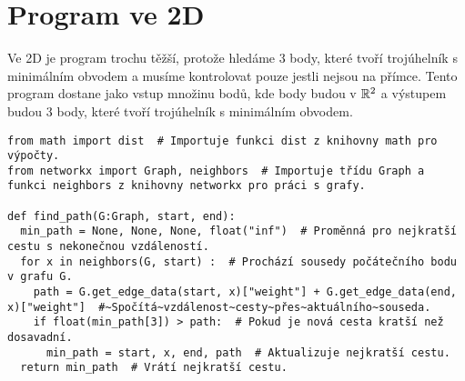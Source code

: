 \section{Program ve 2D}
\label{sec:program_2D}

Ve 2D je program trochu těžší, protože hledáme 3 body, které tvoří trojúhelník s minimálním obvodem a musíme kontrolovat pouze jestli nejsou na přímce. Tento program dostane jako vstup množinu bodů, kde body budou v $\mathbb{R}^2$ a výstupem budou 3 body, které tvoří trojúhelník s minimálním obvodem. 
\begin{mdframed}[style=MyFrame]
\begin{lstlisting}[style=metoo]
from math import dist  # Importuje funkci dist z knihovny math pro výpočty.
from networkx import Graph, neighbors  # Importuje třídu Graph a funkci neighbors z knihovny networkx pro práci s grafy.

def find_path(G:Graph, start, end):
  min_path = None, None, None, float("inf")  # Proměnná pro nejkratší cestu s nekonečnou vzdáleností.
  for x in neighbors(G, start) :  # Prochází sousedy počátečního bodu v grafu G.
    path = G.get_edge_data(start, x)["weight"] + G.get_edge_data(end, x)["weight"]  #~Spočítá~vzdálenost~cesty~přes~aktuálního~souseda.
    if float(min_path[3]) > path:  # Pokud je nová cesta kratší než dosavadní.
      min_path = start, x, end, path  # Aktualizuje nejkratší cestu.
  return min_path  # Vrátí nejkratší cestu.


\end{lstlisting}
\end{mdframed}
